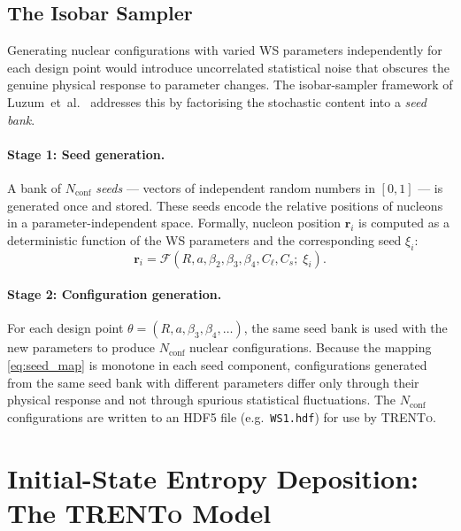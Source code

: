 \documentclass[12pt,a4paper,twoside]{report}
\newcommand{\trento}{\textsc{TRENTo}\xspace}
\begin{document}
\subsection{The Isobar Sampler}
\label{subsec:isobar_sampler}

Generating nuclear configurations with varied WS parameters
independently for each design point would introduce uncorrelated
statistical noise that obscures the genuine physical response to
parameter changes.  The isobar-sampler framework of
Luzum~et~al.~\cite{Luzum2023_sampler} addresses this by factorising
the stochastic content into a \emph{seed bank}.

\paragraph{Stage 1: Seed generation.}
A bank of $N_\mathrm{conf}$ \emph{seeds} — vectors of independent
random numbers in $[0,1]$ — is generated once and stored.  These seeds
encode the relative positions of nucleons in a parameter-independent
space.  Formally, nucleon position $\bm{r}_i$ is computed as a
deterministic function of the WS parameters and the corresponding seed
$\xi_i$:
\begin{equation}
  \bm{r}_i = \mathcal{F}\!\left(R, a, \beta_2, \beta_3, \beta_4,
              C_\ell, C_s;\; \xi_i\right).
  \label{eq:seed_map}
\end{equation}

\paragraph{Stage 2: Configuration generation.}
For each design point $\theta = (R, a, \beta_3, \beta_4, \ldots)$,
the same seed bank is used with the new parameters to produce
$N_\mathrm{conf}$ nuclear configurations.  Because the mapping
\cref{eq:seed_map} is monotone in each seed component,
configurations generated from the same seed bank with different
parameters differ only through their physical response and not through
spurious statistical fluctuations.  The $N_\mathrm{conf}$ configurations
are written to an HDF5 file (e.g.\ \texttt{WS1.hdf}) for use by \trento.

\section{Initial-State Entropy Deposition: The \trento Model}
\label{sec:trento}
\end{document}
